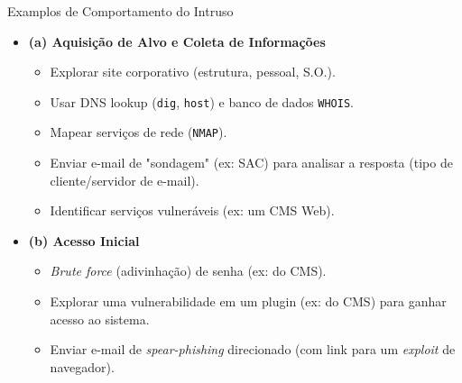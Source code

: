 \begin{frame}{Examplos de Comportamento do Intruso}
    \begin{itemize}
        \item \textbf{(a) Aquisição de Alvo e Coleta de Informações}
              \begin{itemize}
                  \item Explorar site corporativo (estrutura, pessoal, S.O.).
                  \item Usar DNS lookup (\texttt{dig}, \texttt{host}) e banco de dados \texttt{WHOIS}.
                  \item Mapear serviços de rede (\texttt{NMAP}).
                  \item Enviar e-mail de "sondagem" (ex: SAC) para analisar a resposta (tipo de cliente/servidor de e-mail).
                  \item Identificar serviços vulneráveis (ex: um CMS Web).
              \end{itemize}

        \item \textbf{(b) Acesso Inicial}
              \begin{itemize}
                  \item \textit{Brute force} (adivinhação) de senha (ex: do CMS).
                  \item Explorar uma vulnerabilidade em um plugin (ex: do CMS) para ganhar acesso ao sistema.
                  \item Enviar e-mail de \textit{spear-phishing} direcionado (com link para um \textit{exploit} de navegador).
              \end{itemize}
    \end{itemize}
\end{frame}
